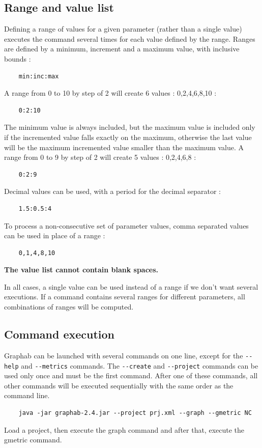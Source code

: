 \documentclass[a4paper,10pt]{report}
\begin{document}
\subsection{Range and value list}
Defining a range of values for a given parameter (rather than a single value) executes the command several times for each value defined by the range.
Ranges are defined by a minimum, increment and a maximum value, with inclusive bounds :
\begin{Verbatim}
	min:inc:max
\end{Verbatim}
A range from 0 to 10 by step of 2 will create 6 values : 0,2,4,6,8,10 :
\begin{Verbatim}
	0:2:10
\end{Verbatim}
The minimum value is always included, but the maximum value is included only if the incremented value falls exactly on the maximum, 
otherwise the last value will be the maximum incremented value smaller than the maximum value.
A range from 0 to 9 by step of 2 will create 5 values : 0,2,4,6,8 :
\begin{Verbatim}
	0:2:9
\end{Verbatim}
Decimal values can be used, with a period for the decimal separator : 
\begin{Verbatim}
	1.5:0.5:4
\end{Verbatim}
To process a non-consecutive set of parameter values, comma separated values can be used in place of a range :
\begin{Verbatim}
	0,1,4,8,10
\end{Verbatim}
\textbf{The value list cannot contain blank spaces.}

In all cases, a single value can be used instead of a range if we don't want several executions.
If a command contains several ranges for different parameters, all combinations of ranges will be computed.

\subsection{Command execution}
Graphab can be launched with several commands on one line, except for the \verb|--help| and \verb|--metrics| commands.
The \verb|--create| and \verb|--project| commands can be used only once and must be the first command. 
After one of these commands, all other commands will be executed sequentially with the same order as the command line.

\begin{Verbatim}
	java -jar graphab-2.4.jar --project prj.xml --graph --gmetric NC  
\end{Verbatim}
Load a project, then execute the graph command and after that, execute the gmetric command.
\end{document}
